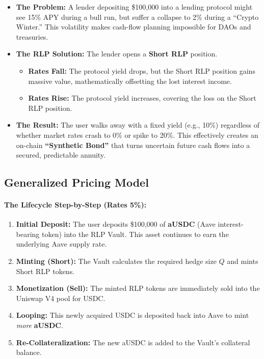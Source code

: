 \documentclass[12pt]{article}
\begin{document}
\begin{itemize}
    \item \textbf{The Problem:} A lender depositing \$100,000 into a lending protocol might see 15\% APY during a bull run, but suffer a collapse to 2\% during a ``Crypto Winter.'' This volatility makes cash-flow planning impossible for DAOs and treasuries.
    \item \textbf{The RLP Solution:} The lender opens a \textbf{Short RLP} position.
    \begin{itemize}
        \item \textbf{Rates Fall:} The protocol yield drops, but the Short RLP position gains massive value, mathematically offsetting the lost interest income.
        \item \textbf{Rates Rise:} The protocol yield increases, covering the loss on the Short RLP position.
    \end{itemize}
    \item \textbf{The Result:} The user walks away with a fixed yield (e.g., 10\%) regardless of whether market rates crash to 0\% or spike to 20\%. This effectively creates an on-chain \textbf{``Synthetic Bond''} that turns uncertain future cash flows into a secured, predictable annuity.
\end{itemize}

\subsection{Generalized Pricing Model}

\paragraph{The Lifecycle Step-by-Step (Rates 5\%):}

\begin{enumerate}
    \item \textbf{Initial Deposit:} The user deposits \$100,000 of \textbf{aUSDC} (Aave interest-bearing token) into the RLP Vault. This asset continues to earn the underlying Aave supply rate.
    \item \textbf{Minting (Short):} The Vault calculates the required hedge size $Q$ and mints Short RLP tokens.
    \item \textbf{Monetization (Sell):} The minted RLP tokens are immediately sold into the Uniswap V4 pool for USDC.
    \item \textbf{Looping:} This newly acquired USDC is deposited back into Aave to mint \emph{more} \textbf{aUSDC}.
    \item \textbf{Re-Collateralization:} The new aUSDC is added to the Vault's collateral balance.
\end{enumerate}
\end{document}
